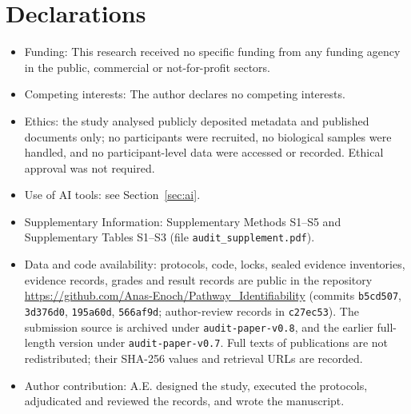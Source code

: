 \documentclass[pdflatex,sn-basic]{sn-jnl}
\begin{document}








\backmatter

\section*{Declarations}

\begin{itemize}
\item Funding: This research received no specific funding from any funding agency in the public, commercial or not-for-profit sectors.
\item Competing interests: The author declares no competing interests.
\item Ethics: the study analysed publicly deposited metadata and published documents only; no participants were recruited, no biological samples were handled, and no participant-level data were accessed or recorded. Ethical approval was not required.
\item Use of AI tools: see Section~\ref{sec:ai}.
\item Supplementary Information: Supplementary Methods S1--S5 and Supplementary Tables S1--S3 (file \texttt{audit\_supplement.pdf}).
\item Data and code availability: protocols, code, locks, sealed evidence inventories, evidence records, grades and
      result records are public in the repository \url{https://github.com/Anas-Enoch/Pathway_Identifiability}
      (commits \texttt{b5cd507}, \texttt{3d376d0}, \texttt{195a60d}, \texttt{566af9d}; author-review records in
      \texttt{c27ec53}). The submission source is archived under \texttt{audit-paper-v0.8},
      and the earlier full-length version under \texttt{audit-paper-v0.7}. Full texts of publications
      are not redistributed; their SHA-256 values and retrieval URLs are recorded.
\item Author contribution: A.E. designed the study, executed the protocols, adjudicated and reviewed the records, and wrote the manuscript.
\end{itemize}


\end{document}
